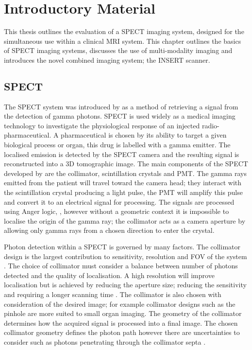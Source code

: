 \chapter{Introductory Material}
\label{Introduction}

This thesis outlines the evaluation of a \acrshort{SPECT} imaging system, designed for the simultaneous use within a clinical \acrshort{MRI} system. This chapter outlines the basics of \acrshort{SPECT} imaging systems, discusses the use of multi-modality imaging and introduces the novel combined imaging system; the \acrshort{INSERT} scanner. 

\section{SPECT}
The \acrlong{SPECT} system was introduced by \cite{Anger1958ScintillationCamera} as a method of retrieving a signal from the detection of gamma photons. \acrshort{SPECT} is used widely as a medical imaging technology to investigate the physiological response of an injected radio-pharmaceutical. A pharmaceutical is chosen by its ability to target a given biological process or organ, this drug is labelled with a gamma emitter. The localised emission is detected by the \acrshort{SPECT} camera and the resulting signal is reconstructed into a 3D tomographic image. The main components of the \acrshort{SPECT} developed by \cite{Anger1952UseStudies} are the collimator, scintillation crystals and \acrlong{PMT}. The gamma rays emitted from the patient will travel toward the camera head; they interact with the scintillation crystal producing a light pulse, the \acrshort{PMT} will amplify this pulse and convert it to an electrical signal for processing. The signals are processed using Anger logic, \cite{Peterson2011SPECTBeyond.}, however without a geometric context it is impossible to localise the origin of the gamma ray; the collimator acts as a camera aperture by allowing only gamma rays from a chosen direction to enter the crystal.

Photon detection within a \acrshort{SPECT} is governed by many factors. The collimator design is the largest contribution to sensitivity, resolution and \acrlong{FOV} of the system \cite{0031-9155-50-21-004}. The choice of collimator must consider a balance between number of photons detected and the quality of localisation. A high resolution will improve localisation but is achieved by reducing the aperture size; reducing the sensitivity and requiring a longer scanning time \cite{doi:10.1001/jama.1965.03080190014004}. The collimator is also chosen with consideration of the desired image; for example collimator designs such as the pinhole are more suited to small organ imaging. The geometry of the collimator determines how the acquired signal is processed into a final image. The chosen collimator geometry defines the photon path however there are uncertainties to consider such as photons penetrating through the collimator septa \cite{Accorsi2008DerivationCollimation}. 

